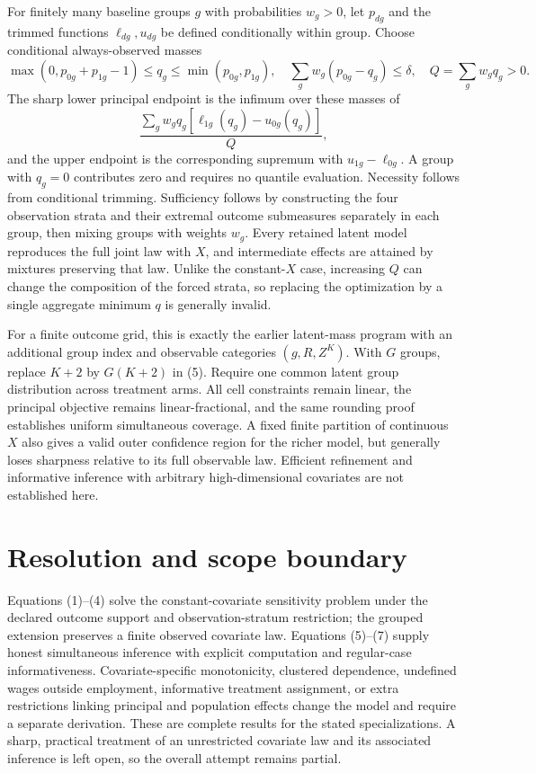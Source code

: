 \documentclass[11pt,a4paper]{article}
\begin{document}
For finitely many baseline groups $g$ with probabilities $w_g>0$, let $p_{dg}$ and the trimmed functions $\ell_{dg},u_{dg}$ be defined conditionally within group. Choose conditional always-observed masses
\[
 \max(0,p_{0g}+p_{1g}-1)\le q_g\le\min(p_{0g},p_{1g}),
 \quad \sum_gw_g(p_{0g}-q_g)\le\delta,
 \quad Q=\sum_gw_gq_g>0.
\]
The sharp lower principal endpoint is the infimum over these masses of
\[
 \frac{\sum_gw_gq_g[\ell_{1g}(q_g)-u_{0g}(q_g)]}{Q},
\]
and the upper endpoint is the corresponding supremum with $u_{1g}-\ell_{0g}$. A group with $q_g=0$ contributes zero and requires no quantile evaluation. Necessity follows from conditional trimming. Sufficiency follows by constructing the four observation strata and their extremal outcome submeasures separately in each group, then mixing groups with weights $w_g$. Every retained latent model reproduces the full joint law with $X$, and intermediate effects are attained by mixtures preserving that law. Unlike the constant-$X$ case, increasing $Q$ can change the composition of the forced strata, so replacing the optimization by a single aggregate minimum $q$ is generally invalid.

For a finite outcome grid, this is exactly the earlier latent-mass program with an additional group index and observable categories $(g,R,Z^K)$. With $G$ groups, replace $K+2$ by $G(K+2)$ in (5). Require one common latent group distribution across treatment arms. All cell constraints remain linear, the principal objective remains linear-fractional, and the same rounding proof establishes uniform simultaneous coverage. A fixed finite partition of continuous $X$ also gives a valid outer confidence region for the richer model, but generally loses sharpness relative to its full observable law. Efficient refinement and informative inference with arbitrary high-dimensional covariates are not established here.

\section{Resolution and scope boundary}
Equations (1)--(4) solve the constant-covariate sensitivity problem under the declared outcome support and observation-stratum restriction; the grouped extension preserves a finite observed covariate law. Equations (5)--(7) supply honest simultaneous inference with explicit computation and regular-case informativeness. Covariate-specific monotonicity, clustered dependence, undefined wages outside employment, informative treatment assignment, or extra restrictions linking principal and population effects change the model and require a separate derivation. These are complete results for the stated specializations. A sharp, practical treatment of an unrestricted covariate law and its associated inference is left open, so the overall attempt remains partial.
\end{document}
